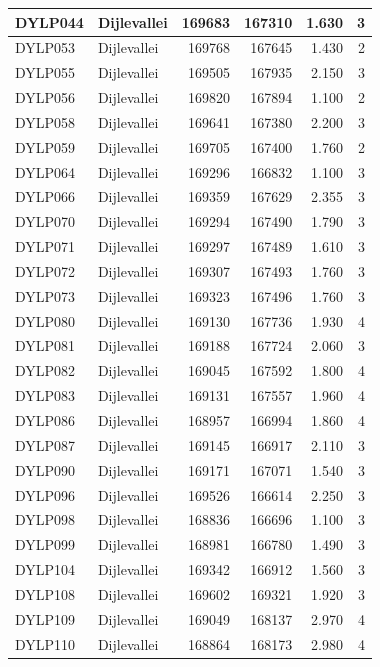 \documentclass[11pt,]{book}
\begin{document}
\begin{table}
\begin{tabular}[t]{l|l|r|r|r|r}
\hline
DYLP044 & Dijlevallei & 169683 & 167310 & 1.630 & 3\\
\hline
DYLP053 & Dijlevallei & 169768 & 167645 & 1.430 & 2\\
\hline
DYLP055 & Dijlevallei & 169505 & 167935 & 2.150 & 3\\
\hline
DYLP056 & Dijlevallei & 169820 & 167894 & 1.100 & 2\\
\hline
DYLP058 & Dijlevallei & 169641 & 167380 & 2.200 & 3\\
\hline
DYLP059 & Dijlevallei & 169705 & 167400 & 1.760 & 2\\
\hline
DYLP064 & Dijlevallei & 169296 & 166832 & 1.100 & 3\\
\hline
DYLP066 & Dijlevallei & 169359 & 167629 & 2.355 & 3\\
\hline
DYLP070 & Dijlevallei & 169294 & 167490 & 1.790 & 3\\
\hline
DYLP071 & Dijlevallei & 169297 & 167489 & 1.610 & 3\\
\hline
DYLP072 & Dijlevallei & 169307 & 167493 & 1.760 & 3\\
\hline
DYLP073 & Dijlevallei & 169323 & 167496 & 1.760 & 3\\
\hline
DYLP080 & Dijlevallei & 169130 & 167736 & 1.930 & 4\\
\hline
DYLP081 & Dijlevallei & 169188 & 167724 & 2.060 & 3\\
\hline
DYLP082 & Dijlevallei & 169045 & 167592 & 1.800 & 4\\
\hline
DYLP083 & Dijlevallei & 169131 & 167557 & 1.960 & 4\\
\hline
DYLP086 & Dijlevallei & 168957 & 166994 & 1.860 & 4\\
\hline
DYLP087 & Dijlevallei & 169145 & 166917 & 2.110 & 3\\
\hline
DYLP090 & Dijlevallei & 169171 & 167071 & 1.540 & 3\\
\hline
DYLP096 & Dijlevallei & 169526 & 166614 & 2.250 & 3\\
\hline
DYLP098 & Dijlevallei & 168836 & 166696 & 1.100 & 3\\
\hline
DYLP099 & Dijlevallei & 168981 & 166780 & 1.490 & 3\\
\hline
DYLP104 & Dijlevallei & 169342 & 166912 & 1.560 & 3\\
\hline
DYLP108 & Dijlevallei & 169602 & 169321 & 1.920 & 3\\
\hline
DYLP109 & Dijlevallei & 169049 & 168137 & 2.970 & 4\\
\hline
DYLP110 & Dijlevallei & 168864 & 168173 & 2.980 & 4\\

\end{tabular}
\end{table}
\end{document}
